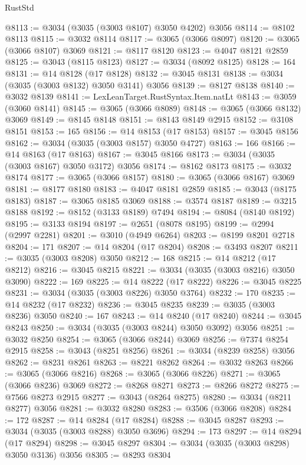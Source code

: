 \begin{lexlean}{RustStd}
\begin{coremodule}
@8113 := @3034 (@3035 (@3003 @8107) @3050 @4202) @3056
@8114 := @8102 @8113
@8115 := @3032 @8114
@8117 := @3065 (@3066 @8097)
@8120 := @3065 (@3066 @8107) @3069
@8121 := @8117 @8120
@8123 := @4047 @8121 @2859
@8125 := @3043 (@8115 @8123)
@8127 := @3034 (@8092 @8125)
@8128 := 164
@8131 := @14 @8128 (@17 @8128)
@8132 := @3045 @8131
@8138 := @3034 (@3035 (@3003 @8132) @3050 @3141) @3056
@8139 := @8127 @8138
@8140 := @3032 @8139
@8141 := LexLeanTarget.RustSyntax.Item.natLt
@8143 := @3059 (@3060 @8141)
@8145 := @3065 (@3066 @8089)
@8148 := @3065 (@3066 @8132) @3069
@8149 := @8145 @8148
@8151 := @8143 @8149 @2915
@8152 := @3108 @8151
@8153 := 165
@8156 := @14 @8153 (@17 @8153)
@8157 := @3045 @8156
@8162 := @3034 (@3035 (@3003 @8157) @3050 @4727)
@8163 := 166
@8166 := @14 @8163 (@17 @8163)
@8167 := @3045 @8166
@8173 := @3034 (@3035 (@3003 @8167) @3050 @3172) @3056
@8174 := @8162 @8173
@8175 := @3032 @8174
@8177 := @3065 (@3066 @8157)
@8180 := @3065 (@3066 @8167) @3069
@8181 := @8177 @8180
@8183 := @4047 @8181 @2859
@8185 := @3043 (@8175 @8183)
@8187 := @3065 @8185 @3069
@8188 := @3574 @8187
@8189 := @3215 @8188
@8192 := @8152 (@3133 @8189) @7494
@8194 := @8084 (@8140 @8192)
@8195 := @3133 @8194
@8197 := @2651 (@8078 @8195)
@8199 := @2994 (@2997 @2281)
@8201 := @3010 (@4949 @6264)
@8203 := @8199 @8201 @2718
@8204 := 171
@8207 := @14 @8204 (@17 @8204)
@8208 := @3493 @8207
@8211 := @3035 (@3003 @8208) @3050
@8212 := 168
@8215 := @14 @8212 (@17 @8212)
@8216 := @3045 @8215
@8221 := @3034 (@3035 (@3003 @8216) @3050 @3090)
@8222 := 169
@8225 := @14 @8222 (@17 @8222)
@8226 := @3045 @8225
@8231 := @3034 (@3035 (@3003 @8226) @3050 @3764)
@8232 := 170
@8235 := @14 @8232 (@17 @8232)
@8236 := @3045 @8235
@8239 := @3035 (@3003 @8236) @3050
@8240 := 167
@8243 := @14 @8240 (@17 @8240)
@8244 := @3045 @8243
@8250 := @3034 (@3035 (@3003 @8244) @3050 @3092) @3056
@8251 := @3032 @8250
@8254 := @3065 (@3066 @8244) @3069
@8256 := @7374 @8254 @2915
@8258 := @3043 (@8251 @8256)
@8261 := @3034 (@8239 @8258) @3056
@8262 := @8231 @8261
@8263 := @8221 @8262
@8264 := @3032 @8263
@8266 := @3065 (@3066 @8216)
@8268 := @3065 (@3066 @8226)
@8271 := @3065 (@3066 @8236) @3069
@8272 := @8268 @8271
@8273 := @8266 @8272
@8275 := @7566 @8273 @2915
@8277 := @3043 (@8264 @8275)
@8280 := @3034 (@8211 @8277) @3056
@8281 := @3032 @8280
@8283 := @3506 (@3066 @8208)
@8284 := 172
@8287 := @14 @8284 (@17 @8284)
@8288 := @3045 @8287
@8293 := @3034 (@3035 (@3003 @8288) @3050 @3696)
@8294 := 173
@8297 := @14 @8294 (@17 @8294)
@8298 := @3045 @8297
@8304 := @3034 (@3035 (@3003 @8298) @3050 @3136) @3056
@8305 := @8293 @8304

\end{coremodule}
\end{lexlean}
